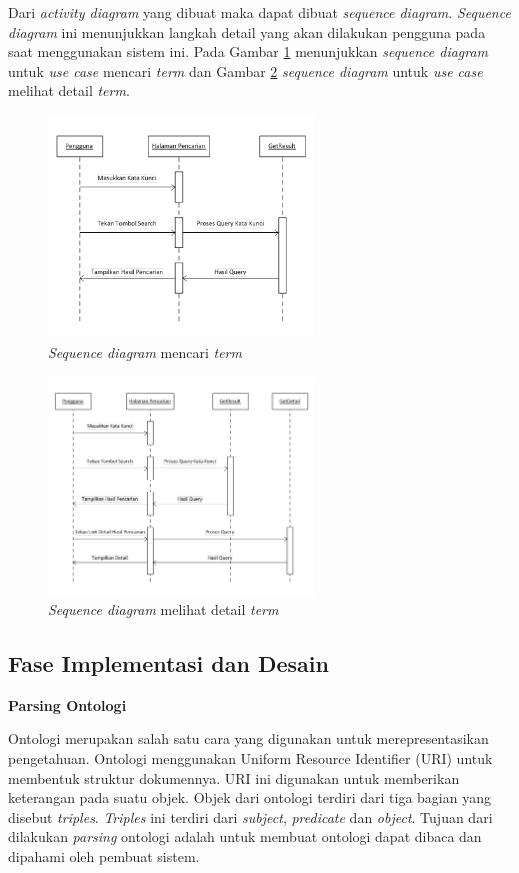 Dari \textit{activity diagram} yang dibuat maka dapat dibuat \textit{sequence diagram}. \textit{Sequence diagram} ini menunjukkan langkah detail yang akan dilakukan pengguna pada saat menggunakan sistem ini. Pada Gambar \ref{fig:sequence_1} menunjukkan \textit{sequence diagram} untuk \textit{use case} mencari \textit{term} dan Gambar \ref{fig:sequence_2} \textit{sequence diagram} untuk \textit{use case} melihat detail \textit{term}.
\begin{figure}[h!] %
	\centering
	\includegraphics[width=200pt]{sequence_1.png}
	\caption{\textit{Sequence diagram} mencari \textit{term}}
	\label{fig:sequence_1}
\end{figure}
\begin{figure}[h!] %
	\centering
	\includegraphics[width=200pt]{sequence_2.png}
	\caption{\textit{Sequence diagram} melihat detail \textit{term}}
	\label{fig:sequence_2}
\end{figure}
\subsection*{Fase Implementasi dan Desain}
\begin{flushleft}
\textbf{Parsing Ontologi}
\end{flushleft}
Ontologi merupakan salah satu cara yang digunakan untuk merepresentasikan pengetahuan. Ontologi menggunakan Uniform Resource Identifier (URI) untuk membentuk struktur dokumennya. URI ini digunakan untuk memberikan keterangan pada suatu objek. Objek dari ontologi terdiri dari tiga bagian yang disebut \textit{triples}. \textit{Triples} ini terdiri dari\textit{ subject}, \textit{predicate} dan \textit{object}. Tujuan dari dilakukan \textit{parsing} ontologi adalah untuk membuat ontologi dapat dibaca dan dipahami oleh pembuat sistem.

